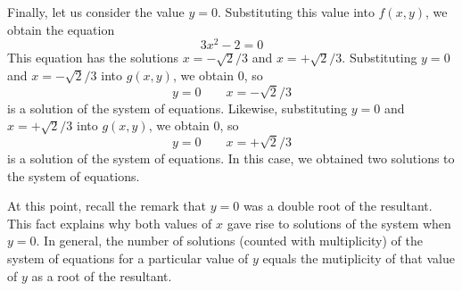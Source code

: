 \documentclass[12pt]{article}
\begin{document}
Finally, let us consider the value $y = 0$.  Substituting this value into $f(x,y)$, we obtain the equation
 $$3 x^2 - 2 = 0$$
This equation has the solutions $x = -{\sqrt{2} / 3}$ and $x = +{\sqrt{2} / 3}$.  Substituting $y = 0$ and $x = -{\sqrt{2} / 3}$ into $g(x,y)$, we obtain $0$, so
 $$y = 0 \qquad x = -{\sqrt{2} / 3}$$
is a solution of the system of equations.  Likewise, substituting $y = 0$ and $x = +{\sqrt{2} / 3}$ into $g(x,y)$, we obtain $0$, so
 $$y = 0 \qquad x = +{\sqrt{2} / 3}$$
is a solution of the system of equations.  In this case, we obtained two solutions to the system of equations.

At this point, recall the remark that $y = 0$ was a double root of the resultant.  This fact explains why both values of $x$ gave rise to solutions of the system when $y=0$.  In general, the number of solutions (counted with multiplicity) of the system of equations for a particular value of $y$ equals the mutiplicity of that value of $y$ as a root of the resultant.
\end{document}
